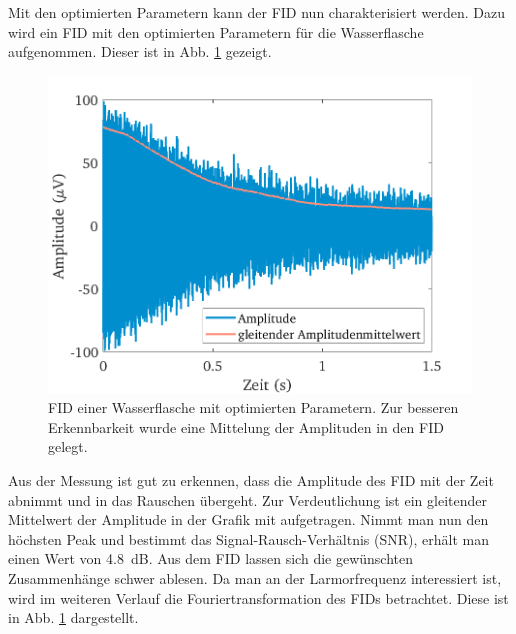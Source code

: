 \documentclass[../main.tex]{subfiles}
\begin{document}
    Mit den optimierten Parametern kann der FID nun charakterisiert werden. Dazu wird ein FID mit den optimierten Parametern für die Wasserflasche aufgenommen. Dieser ist in Abb. \ref{fig:FID_Optimised} gezeigt.
    \begin{figure}[H]
        \centering
        \includegraphics[width=\textwidth]{Bilddateien/7/Part7_Fig_1.png}
        \caption{FID einer Wasserflasche mit optimierten Parametern. Zur besseren Erkennbarkeit wurde eine Mittelung der Amplituden in den FID gelegt.}
        \label{fig:FID_Optimised}
    \end{figure}
    Aus der Messung ist gut zu erkennen, dass die Amplitude des FID mit der Zeit abnimmt und in das Rauschen übergeht. Zur Verdeutlichung ist ein gleitender Mittelwert der Amplitude in der Grafik mit aufgetragen. Nimmt man nun den höchsten Peak und bestimmt das Signal-Rausch-Verhältnis (SNR), erhält man einen Wert von \SI{4,8}{\deci \bel}. Aus dem FID lassen sich die gewünschten Zusammenhänge schwer ablesen. Da man an der Larmorfrequenz interessiert ist, wird im weiteren Verlauf die Fouriertransformation des FIDs betrachtet. Diese ist in Abb. \ref{fig:FID_Optimised} dargestellt.
\end{document}
